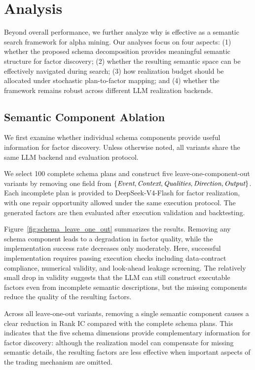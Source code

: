 \section{Analysis}
\label{sec:analysis}

Beyond overall performance, we further analyze why \method{} is
effective as a semantic search framework for alpha mining. Our analyses
focus on four aspects: (1) whether the proposed schema decomposition
provides meaningful semantic structure for factor discovery; (2) whether
the resulting semantic space can be effectively navigated during search;
(3) how realization budget should
be allocated under stochastic plan-to-factor mapping; and (4) whether the
framework remains robust across different LLM realization backends.
\subsection{Semantic Component Ablation}

We first examine whether individual schema components provide useful
information for factor discovery. Unless otherwise noted, all variants
share the same LLM backend and evaluation protocol.

We select 100 complete schema plans and construct five
leave-one-component-out variants by removing one field from
\(\{\emph{Event}, \emph{Context}, \emph{Qualities}, \emph{Direction},
\emph{Output}\}\). Each incomplete plan is provided to DeepSeek-V4-Flash
for factor realization, with one repair opportunity allowed under the
same execution protocol. The generated factors are then evaluated after
execution validation and backtesting.

Figure~\ref{fig:schema_leave_one_out} summarizes the results. Removing
any schema component leads to a degradation in factor quality, while
the implementation success rate decreases only moderately. Here,
successful implementation requires passing execution checks including
data-contract compliance, numerical validity, and look-ahead leakage
screening. The relatively small drop in validity suggests that the LLM
can still construct executable factors even from incomplete semantic
descriptions, but the missing components reduce the quality of the
resulting factors.

Across all leave-one-out variants, removing a single semantic component
causes a clear reduction in Rank IC compared with the complete schema
plans. This indicates that the five schema dimensions provide
complementary information for factor discovery: although the realization
model can compensate for missing semantic details, the resulting factors
are less effective when important aspects of the trading mechanism are
omitted.


